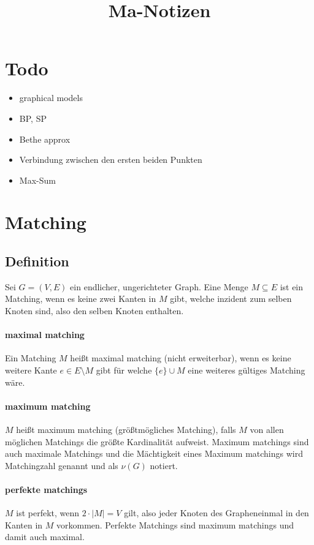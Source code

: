 \documentclass[paper=a4,10pt]{scrartcl}
\begin{document}
\title{Ma-Notizen}

\section{Todo}
\begin{itemize}
\item graphical models
\item BP, SP
\item Bethe approx
\item Verbindung zwischen den ersten beiden Punkten
\item Max-Sum
\end{itemize}

\section{Matching}
\subsection{Definition}
Sei $G=(V,E)$ ein endlicher, ungerichteter Graph. Eine Menge $M\subseteq E$ ist ein Matching, wenn es keine zwei Kanten in $M$ gibt, welche inzident zum selben Knoten sind, also den selben Knoten enthalten.

\paragraph{maximal matching}
Ein Matching $M$ heißt maximal matching (nicht erweiterbar), wenn es keine weitere Kante $e \in E \setminus M$ gibt für welche $\{ e\} \cup M$ eine weiteres gültiges Matching wäre.

\paragraph{maximum matching}
$M$ heißt maximum matching (größtmögliches Matching), falls $M$ von allen möglichen Matchings die größte Kardinalität aufweist. Maximum matchings sind auch maximale Matchings und die Mächtigkeit eines Maximum matchings wird Matchingzahl genannt und als $\nu(G)$ notiert.

\paragraph{perfekte matchings}
$M$ ist perfekt, wenn $2 \cdot |M| = V$ gilt, also jeder Knoten des Grapheneinmal in den Kanten in $M$ vorkommen. Perfekte Matchings sind maximum matchings und damit auch maximal. 
\end{document}
